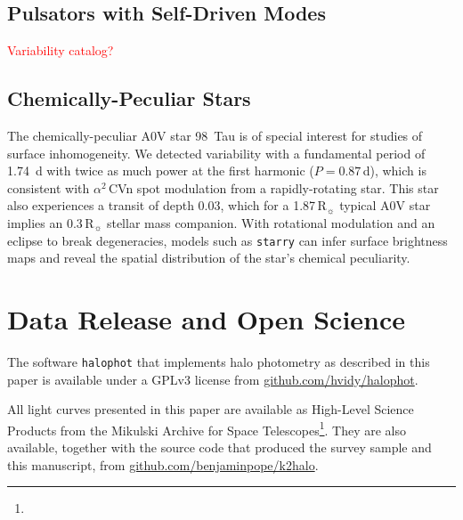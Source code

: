 \documentclass[modern]{aastex62}
\newcommand{\numax}{\mbox{$\nu_{\rm max}$}\xspace}
\newcommand{\Dnu}{\mbox{$\Delta \nu$}\xspace}
\newcommand{\muHz}{\mbox{$\mu$Hz}\xspace}
\newcommand{\rsun}{\mbox{$\mathrm{R}_{\sun}$}\xspace}
\begin{document}
\begin{figure*}
\caption{Summary plots for \textsc{k2sc}-corrected final halo light curve for the red giant $\eta$~Cancri, in the same format as Figure~\ref{fig:rholeo}. Solar like oscillations are clearly detected with $\numax = 22.9 \pm 0.9$\,\muHz and $\Dnu = 2.7 \pm 0.03$\,\muHz.}
\label{fig:etacnc}
\end{figure*}


\subsection{Pulsators with Self-Driven Modes}
\label{sec:variables}
\textcolor{red}{Variability catalog?}


\subsection{Chemically-Peculiar Stars}

The chemically-peculiar A0V star 98~Tau is of special interest for studies of surface inhomogeneity. We detected variability with a fundamental period of 1.74~d with twice as much power at the first harmonic ($P = 0.87$\,d), which is consistent with $\alpha^2$\,CVn spot modulation from a rapidly-rotating star. This star also experiences a transit of depth 0.03, which for a 1.87\,\rsun typical A0V star implies an 0.3\,\rsun stellar mass companion. With rotational modulation and an eclipse to break degeneracies, models such as \texttt{starry} \citep{starry} can infer surface brightness maps and reveal the spatial distribution of the star's chemical peculiarity. 

\section{Data Release and Open Science}

The software \texttt{halophot} that implements halo photometry as described in this paper is available under a GPLv3 license from \href{https://github.com/hvidy/halophot}{github.com/hvidy/halophot}. 

All light curves presented in this paper are available as High-Level Science Products from the Mikulski Archive for Space Telescopes\footnote{}.  They are also available, together with the source code that produced the survey sample and this manuscript, from \href{https://github.com/benjaminpope/k2halo}{github.com/benjaminpope/k2halo}.
\end{document}
